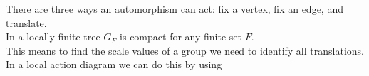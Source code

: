 \documentclass[preview]{standalone}
\begin{document}
There are three ways an automorphism can act: fix a vertex, fix an edge, and translate.\\In a locally finite tree $G_F$ is compact for any finite set $F$.\\This means to find the scale values of a group we need to identify all translations.\phantom{t} \\In a local action diagram we can do this by using\\
\end{document}
